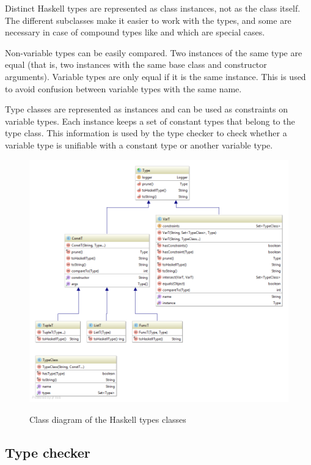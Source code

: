 Distinct Haskell types are represented as class instances, not as the class itself. The different  subclasses make it easier to work with the types, and some are necessary in case of compound types like  and  which are special cases.

Non-variable types can be easily compared. Two instances of the same type are equal (that is, two instances with the same base class and constructor arguments).
Variable types are only equal if it is the same instance. This is used to avoid confusion between variable types with the same name.

Type classes are represented as  instances and can be used as constraints on variable types.
Each  instance keeps a set of constant types that belong to the type class.
This information is used by the type checker to check whether a variable type is unifiable with a constant type or another variable type.

\begin{figure}[h]
\centering
\includegraphics[scale=0.4]{Images/classdiagram-type}
\label{fig:classdiagram-type}
\caption{Class diagram of the Haskell types classes}
\end{figure}

\subsection{Type checker}

